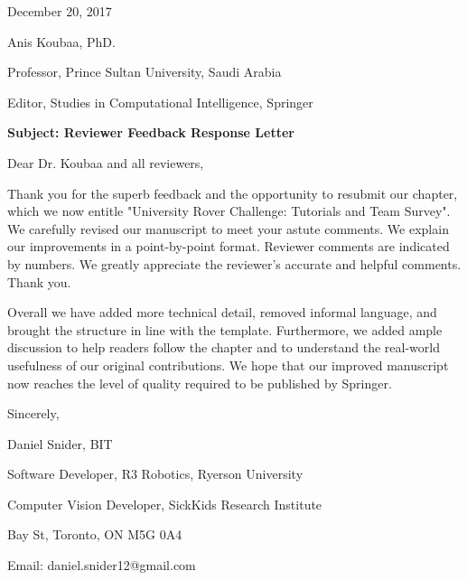 \documentclass[runningheads,a4paper]{llncs}
\begin{document}
\mainmatter  %



\hfill December 20, 2017\vspace{3mm}\\

{

\noindent Anis Koubaa, PhD.

\noindent Professor, Prince Sultan University, Saudi Arabia

\noindent Editor, Studies in Computational Intelligence, Springer

\noindent \textbf{Subject: Reviewer Feedback Response Letter}

}

\vspace{20mm}

\noindent Dear Dr. Koubaa and all reviewers,

\vspace{10mm}
Thank you for the superb feedback and the opportunity to resubmit our chapter, which we now entitle "University Rover Challenge: Tutorials and Team Survey". We carefully revised our manuscript to meet your astute comments. We explain our improvements in a point-by-point format. Reviewer comments are indicated by numbers. We greatly appreciate the reviewer's accurate and helpful comments. Thank you.

Overall we have added more technical detail, removed informal language, and brought the structure in line with the template. Furthermore, we added ample discussion to help readers follow the chapter and to understand the real-world usefulness of our original contributions.
We hope that our improved manuscript now reaches the level of quality required to be published by Springer.

\vspace{8mm}

\noindent Sincerely,

\vspace{10mm}

{
\noindent Daniel Snider, BIT

\noindent Software Developer, R3 Robotics, Ryerson University

\noindent Computer Vision Developer, SickKids Research Institute

 Bay St, Toronto, ON M5G 0A4

\noindent Email: daniel.snider12@gmail.com

}
\end{document}
